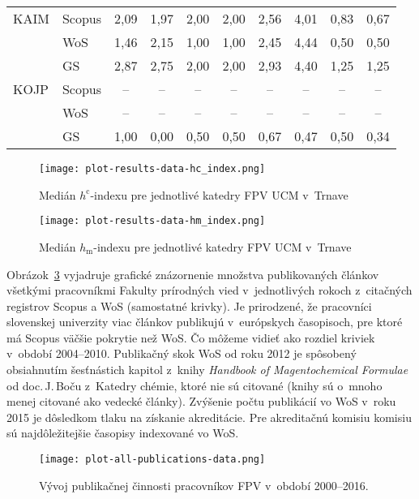 {\begin{table}
\begin{tabularx}{\textwidth}{XXcccc@{\hspace{3ex}}cccc}
 KAIM & Scopus & 2,09     & 1,97 & 2,00  & 2,00 & 2,56     & 4,01 & 0,83 & 0,67 \\
      & WoS    & 1,46     & 2,15 & 1,00  & 1,00 & 2,45     & 4,44 & 0,50 & 0,50 \\
      & GS     & 2,87     & 2,75 & 2,00  & 2,00 & 2,93     & 4,40 & 1,25 & 1,25 \\[3ex]
 KOJP & Scopus & --       & --   & --    & --   & --       & --   & --   & --   \\
      & WoS    & --       & --   & --    & --   & --       & --   & --   & --   \\
      & GS     & 1,00     & 0,00 & 0,50  & 0,50 & 0,67     & 0,47 & 0,50 & 0,34 \\[0.5ex]
  \bottomrule
\end{tabularx}
\end{table}

\begin{figure}
  \centering
  \texttt{[image: plot-results-data-hc\_index.png]}
  \caption{Medián $h^\mathrm{c}$-indexu pre jednotlivé katedry FPV UCM v~Trnave}
  \label{fig:hc-index.plot}
\end{figure}

\begin{figure}
  \centering
  \texttt{[image: plot-results-data-hm\_index.png]}
  \caption{Medián $h_\mathrm{m}$-indexu pre jednotlivé katedry FPV UCM v~Trnave}
  \label{fig:hm-index.plot}
\end{figure}



Obrázok~\ref{fig:all.publications.plot} vyjadruje grafické znázornenie množstva
publikovaných článkov všetkými pracovníkmi Fakulty prírodných vied
v~jednotlivých rokoch z~citačných registrov Scopus a WoS (samostatné krivky).
Je prirodzené, že pracovníci slovenskej univerzity viac článkov publikujú
v~európskych časopisoch, pre ktoré má Scopus väčšie pokrytie než WoS.  Čo môžeme
vidieť ako rozdiel kriviek v~období 2004--2010.  Publikačný skok WoS od roku
2012 je spôsobený obsiahnutím šesťnástich kapitol z~knihy \emph{Handbook of
  Magentochemical Formulae} od doc.\,J.\,Boču z~Katedry chémie, ktoré nie sú
citované (knihy sú o~mnoho menej citované ako vedecké články).  Zvýšenie počtu
publikácií vo WoS v~roku 2015 je dôsledkom tlaku na získanie akreditácie.  Pre
akreditačnú komisiu komisiu sú najdôležitejšie časopisy indexované vo WoS.

\begin{figure}
  \centering
  \texttt{[image: plot-all-publications-data.png]}
  \caption{Vývoj publikačnej činnosti pracovníkov FPV v~období 2000--2016.}
  \label{fig:all.publications.plot}
\end{figure}

}
